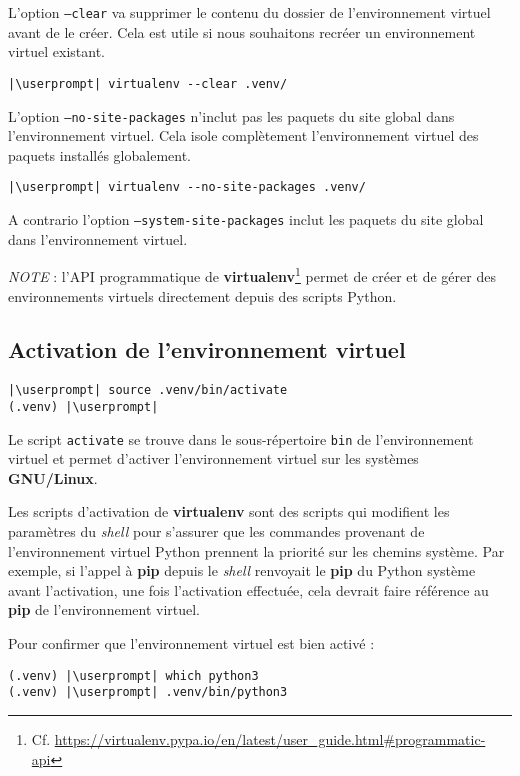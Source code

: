 L'option \texttt{--clear} va supprimer le contenu du dossier de l'environnement virtuel avant de le créer. Cela est utile si nous souhaitons recréer un environnement virtuel existant.
\begin{lstlisting}[style=bash]
|\userprompt| virtualenv --clear .venv/
\end{lstlisting}

L'option \texttt{--no-site-packages} n'inclut pas les paquets du site global dans l'environnement virtuel. Cela isole complètement l'environnement virtuel des paquets installés globalement.
\begin{lstlisting}[style=bash]
|\userprompt| virtualenv --no-site-packages .venv/
\end{lstlisting}

A contrario l'option \texttt{--system-site-packages} inclut les paquets du site global dans l'environnement virtuel.

\textit{NOTE} : l'API programmatique de \textbf{virtualenv}\footnote{Cf. \url{https://virtualenv.pypa.io/en/latest/user_guide.html\#programmatic-api}} permet de créer et de gérer des environnements virtuels directement depuis des scripts Python.

\subsection*{Activation de l'environnement virtuel}
\begin{lstlisting}[style=bash]
|\userprompt| source .venv/bin/activate  
(.venv) |\userprompt|
\end{lstlisting}

Le script \texttt{activate} se trouve dans le sous-répertoire \texttt{bin} de l'environnement virtuel et permet d'activer l'environnement virtuel sur les systèmes \textbf{GNU/Linux}.

Les scripts d'activation de \textbf{virtualenv} sont des scripts qui modifient les paramètres du \textit{shell} pour s'assurer que les commandes provenant de l'environnement virtuel Python prennent la priorité sur les chemins système. Par exemple, si l'appel à \textbf{pip} depuis le \textit{shell} renvoyait le \textbf{pip} du Python système avant l'activation, une fois l'activation effectuée, cela devrait faire référence au \textbf{pip} de l'environnement virtuel.

Pour confirmer que l'environnement virtuel est bien activé :
\begin{lstlisting}[style=bash]
(.venv) |\userprompt| which python3
(.venv) |\userprompt| .venv/bin/python3
\end{lstlisting}


